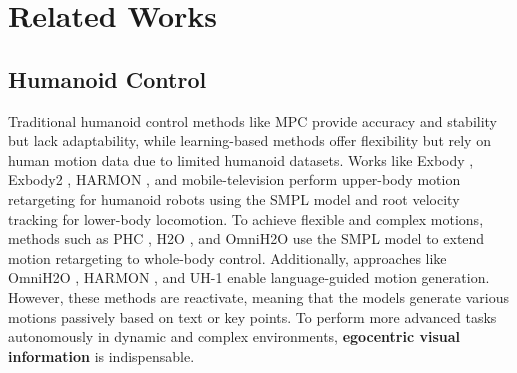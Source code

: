 \section{Related Works}


\subsection{Humanoid Control}
Traditional humanoid control methods \cite{li2023dynamic, kuindersma2016optimization, elobaid2023online, dantec2021whole, dai2014whole} like MPC provide accuracy and stability but lack adaptability, while learning-based methods offer flexibility but rely on human motion data due to limited humanoid datasets.
Works like Exbody \citep{cheng2024expressive}, Exbody2 \citep{ji2024exbody2}, HARMON \citep{jiang2024harmon}, and mobile-television \citep{lu2024mobile} perform upper-body motion retargeting for humanoid robots using the SMPL model \citep{loper2023smpl} and root velocity tracking for lower-body locomotion.
To achieve flexible and complex motions, methods such as PHC \citep{luo2023perpetual}, H2O \citep{he2024learning}, and OmniH2O \citep{he2024omnih2o} use the SMPL model to extend motion retargeting to whole-body control.
Additionally, approaches like OmniH2O \citep{he2024omnih2o}, HARMON \citep{jiang2024harmon}, and UH-1 \citep{mao2024learning} enable language-guided motion generation. However, these methods are reactivate, meaning that the models generate various motions passively based on text or key points. 
To perform more advanced tasks autonomously in dynamic and complex environments, \textbf{egocentric visual information} is indispensable.





